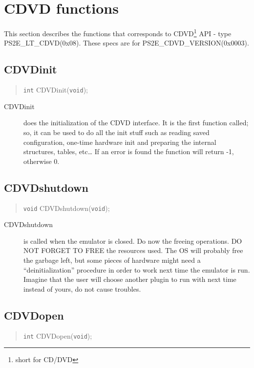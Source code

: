\documentclass[10pt]{article}
\begin{document}
\section{CDVD functions}
This section describes the functions that corresponds to CDVD\footnote{short for CD/DVD}
API - type PS2E\_LT\_CDVD(0x08).
 These specs are for PS2E\_CDVD\_VERSION(0x0003).

\subsection{CDVDinit}
\begin{quote}\texttt{int} CDVDinit(\texttt{void});\end{quote}

\begin{description}
\item[CDVDinit] does the initialization of the CDVD interface.
 It is the first function called; so, it can be used to do all the
 init stuff such as reading saved configuration, one-time hardware init and
 preparing the internal structures, tables, etc\ldots
 If an error is found the function will return -1, otherwise 0.
\end{description}



\subsection{CDVDshutdown}
\begin{quote}\texttt{void} CDVDshutdown(\texttt{void});\end{quote}

\begin{description}
\item[CDVDshutdown] is called when the emulator is closed. Do now the freeing
 operations. DO NOT FORGET TO FREE the resources used. The OS will probably
 free the garbage left, but some pieces of hardware might need a
 ``deinitialization'' procedure in order to work next time the emulator
 is run. Imagine that the user will choose another plugin to run with
 next time instead of yours, do not cause troubles.
\end{description}



\subsection{CDVDopen}
\begin{quote}\texttt{int} CDVDopen(\texttt{void});\end{quote}
\end{document}
